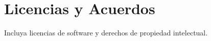 	\chapter{Licencias y Acuerdos}
	Incluya licencias de software y derechos de propiedad intelectual.
	
